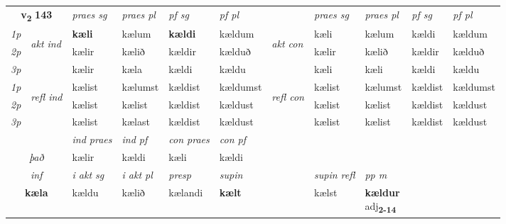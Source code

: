 \noindent
\begin{tabular}{lllllllllll} \toprule
\multicolumn{2}{c}{\textbf{v{\textsubscript{2}}} \Large{\textbf{143}}}  &  \textit{praes sg}  & \textit{praes pl}  &\textit{ pf sg} & \textit{pf pl} &  &  \textit{praes sg}  & \textit{praes pl}  & \textit{pf sg} & \textit{pf pl } \\*
	\cmidrule{3-6} \cmidrule{8-11}
 {\textit{1p}} & \multirow{3}{*}{\begin{turn}{90}\textit{akt ind}\end{turn}} & \textbf{kæli} & kælum & \textbf{kældi} & kældum & \multirow{3}{*}{\begin{turn}{90}\textit{akt con}\end{turn}} &kæli & kælum & kældi & kældum\\*
 {\textit{2p}} &  &  kælir  & kælið & kældir & kælduð & & kælir & kælið & kældir & kælduð \\*
{\textit{3p}} &  & kælir & kæla & kældi & kældu & & kæli & kæli& kældi & kældu \\*
\cmidrule{3-6} \cmidrule{8-11}
 {\textit{1p}} & \multirow{3}{*}{\begin{turn}{90}\textit{refl ind}\end{turn}}  & kælist & kælumst & kældist & kældumst & \multirow{3}{*}{\begin{turn}{90}\textit{refl con}\end{turn}}  &kælist & kælumst & kældist & kældumst \\*
 {\textit{2p}} &  & kælist & kælist & kældist & kældust & &kælist & kælist & kældist & kældust \\*
 {\textit{3p}}  & & kælist & kælast & kældist & kældust & & kælist & kælist& kældist & kældust \\*
\cmidrule{3-6} \cmidrule{8-11}

   & &  \textit{ind praes} & \textit{ind pf} & \textit{con praes} & \textit{con pf} \\*
\multicolumn{2}{c}{ \textit{það} } & kælir & kældi & kæli & kældi \\*

\cmidrule{3-9}
   \multicolumn{2}{c}{\textit{inf}}  & \textit{i akt sg} & \textit{i akt pl}   & \textit{presp} & \textit{supin} && \textit{supin refl} & \textit{pp m} \\*
  \multicolumn{2}{c}{\textbf{kæla}} & kældu  & kælið   & kælandi &  \textbf{kælt} && kælst & \specialcell{\textbf{kældur} \\ adj\textbf{\textsubscript{2-14}}} \\*
\end{tabular}

